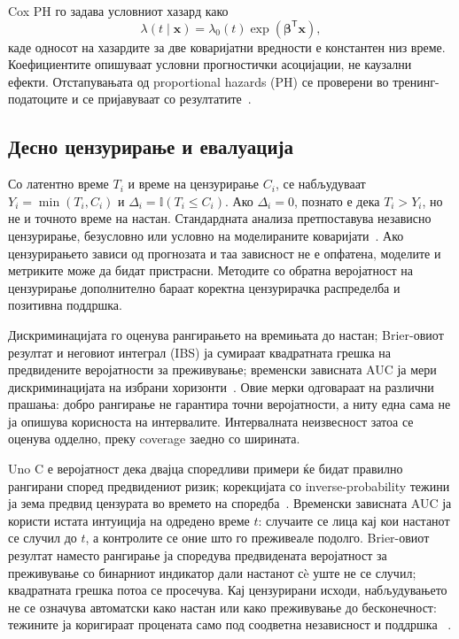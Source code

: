 \documentclass[12pt]{article}
\begin{document}
Cox PH го задава условниот хазард како
\[
\lambda(t\mid\mathbf{x})=\lambda_0(t)\exp(\boldsymbol{\beta}^{\mathsf T}\mathbf{x}),
\]
каде односот на хазардите за две коваријатни вредности е константен низ време.
Коефициентите опишуваат условни прогностички асоцијации, не каузални ефекти.
Отстапувањата од proportional hazards (PH) се проверени во тренинг-податоците
и се пријавуваат со резултатите~\cite{cox1972}.

\subsection{Десно цензурирање и евалуација}

Со латентно време $T_i$ и време на цензурирање $C_i$, се набљудуваат
$Y_i=\min(T_i,C_i)$ и $\Delta_i=\mathbb{I}(T_i\leq C_i)$. Ако
$\Delta_i=0$, познато е дека $T_i>Y_i$, но не и точното време на настан.
Стандардната анализа претпоставува независно цензурирање, безусловно или
условно на моделираните коваријати~\cite{kalbfleisch2002}. Ако цензурирањето
зависи од прогнозата и таа зависност не е опфатена, моделите и метриките може
да бидат пристрасни. Методите со обратна веројатност на цензурирање дополнително
бараат коректна цензурирачка распределба и позитивна поддршка.

Дискриминацијата го оценува рангирањето на времињата до настан; Brier-овиот
резултат и неговиот интеграл (IBS) ја сумираат квадратната грешка на
предвидените веројатности за преживување; временски зависната AUC ја мери
дискриминацијата на избрани хоризонти~\cite{uno2011,graf1999,heagerty2000}.
Овие мерки одговараат на различни прашања: добро рангирање не гарантира точни
веројатности, а ниту една сама не ја опишува корисноста на интервалите.
Интервалната неизвесност затоа се оценува одделно, преку coverage заедно со
ширината.

Uno C е веројатност дека двајца споредливи примери ќе бидат правилно рангирани
според предвидениот ризик; корекцијата со inverse-probability тежини ја зема
предвид цензурата во времето на споредба~\cite{uno2011}. Временски зависната
AUC ја користи истата интуиција на одредено време $t$: случаите се лица кај кои
настанот се случил до $t$, а контролите се оние што го преживеале подолго.
Brier-овиот резултат наместо рангирање ја споредува предвидената веројатност за
преживување со бинарниот индикатор дали настанот сè уште не се случил; квадратната
грешка потоа се просечува. Кај цензурирани исходи, набљудувањето не се означува
автоматски како настан или како преживување до бесконечност: тежините ја
коригираат процената само под соодветна независност и поддршка
~\cite{graf1999,heagerty2000}.
\end{document}
